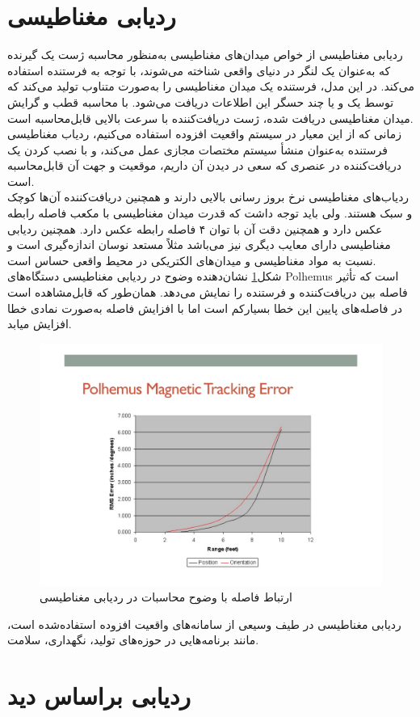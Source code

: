 \section{ردیابی مغناطیسی}
ردیابی مغناطیسی از خواص میدان‌های مغناطیسی به‌منظور محاسبه ژست یک گیرنده  که به‌عنوان یک لنگر در دنیای واقعی شناخته می‌شوند، با توجه به فرستنده استفاده می‌کند. در این مدل، فرستنده یک میدان مغناطیسی را به‌صورت متناوب تولید می‌کند که توسط یک و یا چند حسگر این اطلاعات دریافت می‌شود. با محاسبه قطب و گرایش میدان مغناطیسی دریافت شده، ژست دریافت‌کننده با سرعت بالایی قابل‌محاسبه است.
\\
زمانی که از این معیار در سیستم واقعیت افزوده استفاده می‌کنیم، ردیاب مغناطیسی فرستنده به‌عنوان منشأ سیستم مختصات مجازی عمل می‌کند، و با نصب کردن یک دریافت‌کننده در عنصری که سعی در دیدن آن داریم، موقعیت و جهت آن قابل‌محاسبه است\cite{caudell1992augmented}. 
\\
ردیاب‌های مغناطیسی نرخ بروز رسانی بالایی دارند و همچنین دریافت‌کننده آن‌ها کوچک و سبک هستند. ولی باید توجه داشت که قدرت میدان مغناطیسی با مکعب فاصله رابطه عکس دارد و همچنین دقت آن با توان ۴ فاصله رابطه عکس دارد. همچنین ردیابی مغناطیسی دارای معایب دیگری نیز می‌باشد مثلاً مستعد نوسان اندازه‌گیری است و نسبت به مواد مغناطیسی و میدان‌های الکتریکی در محیط واقعی حساس است.
\\
شکل\ref{fig:magnetic} نشان‌دهنده وضوح در ردیابی مغناطیسی دستگاه‌های Polhemus است که تأثیر فاصله بین دریافت‌کننده و فرستنده را نمایش می‌دهد. همان‌طور که قابل‌مشاهده است در فاصله‌های پایین این خطا بسیارکم است اما با افزایش فاصله به‌صورت نمادی خطا افزایش میابد.
\begin{figure}
	\centering
	\includegraphics[width=1\linewidth]{image/magnetic}
	\caption {ارتباط فاصله با وضوح محاسبات در ردیابی مغناطیسی\protect{}}
	\label{fig:magnetic}
\end{figure}
ردیابی مغناطیسی در طیف وسیعی از سامانه‌های واقعیت افزوده استفاده‌شده است، مانند برنامه‌هایی در حوزه‌های تولید\cite{caudell1992augmented}، نگهداری\cite{feiner1993knowledge}، سلامت\cite{bajura1992merging}.
\section{ردیابی براساس دید}

